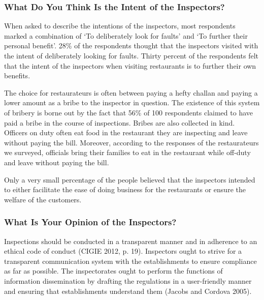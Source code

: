 \documentclass[a4paper, 12pt]{article}
\begin{document}
		
		\subsubsection {What Do You Think Is the Intent of the Inspectors?}
		
		When asked to describe the intentions of the inspectors, most respondents marked a combination of ‘To deliberately look for faults’ and ‘To further their personal benefit’. 28\% of the respondents thought that the inspectors visited with the intent of deliberately looking for faults. Thirty percent of the respondents felt that the intent of the inspectors when visiting restaurants is to further their own benefits.
		
		The choice for restaurateurs is often between paying a hefty challan and paying a lower amount as a bribe to the inspector in question. The existence of this system of bribery is borne out by the fact that 56\% of 100 respondents claimed to have paid a bribe in the course of inspections. Bribes are also collected in kind. Officers on duty often eat food in the restaurant they are inspecting and leave without paying the bill. Moreover, according to the responses of the restaurateurs we surveyed, officials bring their families to eat in the restaurant while off-duty and leave without paying the bill.
		
		Only a very small percentage of the people believed that the inspectors intended to either facilitate the ease of doing business for the restaurants or ensure the welfare of the customers.


		\subsubsection {What Is Your Opinion of the Inspectors?}
		
		Inspections should be conducted in a transparent manner and in adherence to an ethical code of conduct (CIGIE 2012, p. 19). Inspectors ought to strive for a transparent communication system with the establishments to ensure compliance as far as possible. The inspectorates ought to perform the functions of information dissemination by drafting the regulations in a user-friendly manner and ensuring that establishments understand them (Jacobs and Cordova 2005).
		
\end{document}
